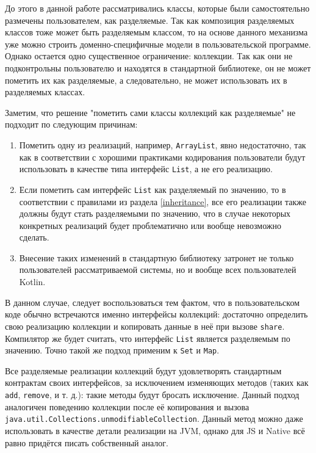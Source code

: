 \documentclass[specification,annotation,times]{itmo-student-thesis}
\begin{document}
До этого в данной работе рассматривались классы, которые были самостоятельно размечены пользователем, как разделяемые.
Так как композиция разделяемых классов тоже может быть разделяемым классом, то на основе данного механизма уже можно строить доменно-специфичные модели в пользовательской программе.
Однако остается одно существенное ограничение: коллекции. Так как они не подконтрольны пользователю и находятся в стандартной библиотеке, он не может пометить их как разделяемые, а следовательно, не может использовать их в разделяемых классах.

Заметим, что решение "пометить сами классы коллекций как разделяемые" не подходит по следующим причинам:

\begin{enumerate}
	\item Пометить одну из реализаций, например, \texttt{ArrayList}, явно недостаточно, так как в соответствии с хорошими практиками кодирования пользователи будут использовать в качестве типа интерфейс \texttt{List}, а не его реализацию.
	\item Если пометить сам интерфейс \texttt{List} как разделяемый по значению, то в соответствии с правилами из раздела \ref{inheritance}, все его реализации также должны будут стать разделяемыми по значению, что в случае некоторых конкретных реализаций будет проблематично или вообще невозможно сделать.
	\item Внесение таких изменений в стандартную библиотеку затронет не только пользователей рассматриваемой системы, но и вообще всех пользователей Kotlin.
\end{enumerate}

В данном случае, следует воспользоваться тем фактом, что в пользовательском коде обычно встречаются именно интерфейсы коллекций: достаточно определить свою реализацию коллекции и копировать данные в неё при вызове \texttt{share}.
Компилятор же будет считать, что интерфейс \texttt{List} является разделяемым по значению.
Точно такой же подход применим к \texttt{Set} и \texttt{Map}.

Все разделяемые реализации коллекций будут удовлетворять стандартным контрактам своих интерфейсов, за исключением изменяющих методов (таких как \texttt{add}, \texttt{remove}, и т. д.): такие методы будут бросать исключение.
Данный подход аналогичен поведению коллекции после её копирования и вызова \texttt{java.util.Collections.unmodifiableCollection}. Данный метод можно даже использовать в качестве детали реализации на JVM, однако для JS и Native всё равно придётся писать собственный аналог.
\end{document}
